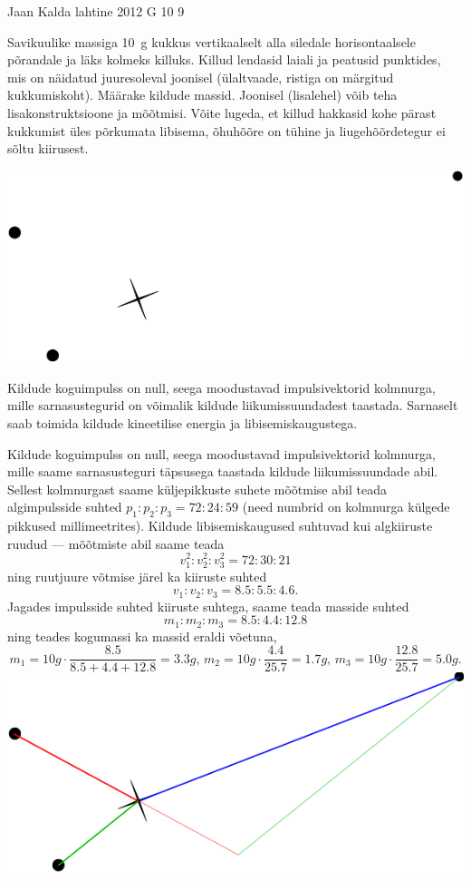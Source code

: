 {Jaan Kalda} %
{lahtine} %
{2012} %
{G 10} %
{9} %
{
\ifStatement
Savikuulike massiga \SI{10}{g} kukkus vertikaalselt alla siledale horisontaalsele
põrandale ja läks kolmeks killuks.
Killud lendasid laiali ja peatusid punktides, mis on näidatud juuresoleval
joonisel
(ülaltvaade, ristiga on märgitud kukkumiskoht). Määrake kildude massid.
Joonisel (lisalehel)
võib teha lisakonstruktsioone ja mõõtmisi.
Võite lugeda, et killud hakkasid kohe pärast kukkumist üles põrkumata libisema,
õhuhõõre on tühine ja liugehõõrdetegur ei sõltu kiirusest.
\begin{center}
\includegraphics[width=0.8\linewidth]{2012-lahg-10-killud}
\end{center}
\fi


\ifHint
Kildude koguimpulss on null, seega moodustavad impulsivektorid kolmnurga, mille sarnasustegurid on võimalik kildude liikumissuundadest taastada. Sarnaselt saab toimida kildude kineetilise energia ja libisemiskaugustega.
\fi


\ifSolution
Kildude koguimpulss on null, seega moodustavad impulsivektorid kolmnurga, mille saame sarnasusteguri täpsusega taastada kildude liikumissuundade abil.
Sellest kolmnurgast saame küljepikkuste suhete mõõtmise abil teada algimpulsside suhted $p_1 : p_2: p_3 = \num{72} : \num{24} : \num{59}$ (need numbrid on 
kolmnurga külgede pikkused millimeetrites). 
Kildude libisemiskaugused suhtuvad kui algkiiruste ruudud --- mõõtmiste abil saame teada 
\[
v_1^2:v_2^2:v_3^2 = \num{72}:\num{30}:\num{21}
\]
ning ruutjuure võtmise järel ka 
kiiruste suhted
\[
v_1 : v_2: v_3 = \num{8,5}:\num{5,5}:\num{4,6}.
\]
Jagades impulsside suhted kiiruste suhtega, saame teada masside suhted
\[
m_1:m_2:m_3=\num{8,5}:\num{4,4}:\num{12,8}
\]
ning teades kogumassi ka massid eraldi võetuna,
\[
m_1=\SI {10}g\cdot \frac{\num{8,5}}{\num{8,5}+\num{4,4}+\num{12,8}} = \SI{3,3}g\text{, }m_2=\SI {10}g\cdot \frac{\num{4,4}}{\num{25,7}}=\SI{1,7}g\text{, } 
m_3=\SI {10}g\cdot \frac{\num{12,8}}{\num{25,7}}=\SI{5,0}g.
\]
\hspace*{0\columnwidth}\includegraphics[width=\columnwidth]{2012-lahg-10-killud_lah}
\fi


}
